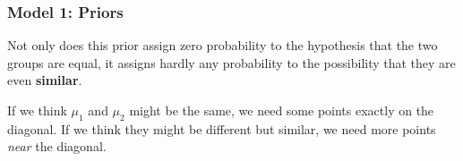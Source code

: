 \documentclass{beamer}
\begin{document}
\begin{frame}[fragile]
\frametitle{Model 1: Priors}
Not only does this prior assign zero probability to the hypothesis that the
two groups are equal, it assigns hardly any probability to the possibility
that they are even {\bf similar}.\\[0.5em]\pause

If we think $\mu_1$ and $\mu_2$ might be the same, we need some points
exactly on
the diagonal. If we think they might be different but similar, we need more
points {\em near} the diagonal.

\end{frame}
\end{document}
